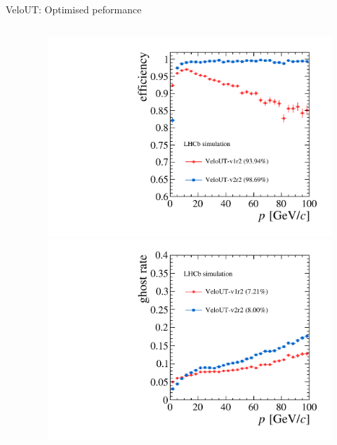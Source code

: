 \documentclass[aspectratio=1610]{beamer}
\begin{document}
\begin{frame}{VeloUT: Optimised peformance}

\begin{columns}
\begin{column}{0.65\textwidth}
\end{column}
\begin{column}{0.35\textwidth}
\centering
\begin{figure}
\vspace*{-1cm}
\includegraphics[height=0.475\textheight]{figs/upstream-tracking-upgrade/eff_p_comp.pdf}\\
\includegraphics[height=0.475\textheight]{figs/upstream-tracking-upgrade/gr_p_comp.pdf}
\end{figure}
\end{column}
\end{columns}

\end{frame}
\end{document}
